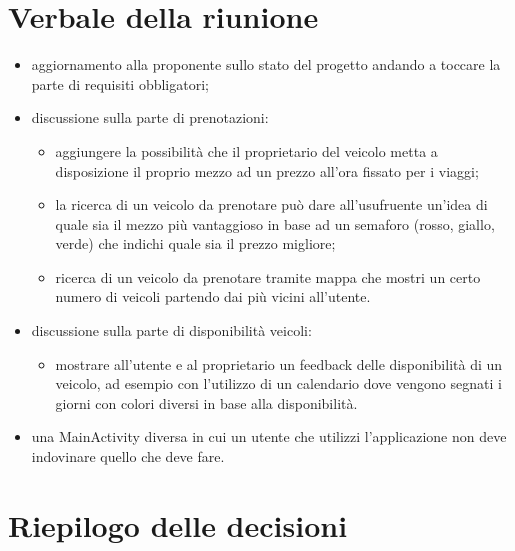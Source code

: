 \section{Verbale della riunione}
\begin{itemize}
	\item aggiornamento alla proponente sullo stato del progetto andando a toccare la parte di requisiti obbligatori;
	\item discussione sulla parte di prenotazioni:
	\begin{itemize}
		\item aggiungere la possibilità che il proprietario del veicolo metta a disposizione il proprio mezzo ad un prezzo all'ora fissato per i viaggi;
		\item la ricerca di un veicolo da prenotare può dare all'usufruente un'idea di quale sia il mezzo più vantaggioso in base ad un semaforo (rosso, giallo, verde) che indichi quale sia il prezzo migliore;
		\item ricerca di un veicolo da prenotare tramite mappa che mostri un certo numero di veicoli partendo dai più vicini all'utente. 
	\end{itemize}
	\item discussione sulla parte di disponibilità veicoli:
	\begin{itemize}
		\item mostrare all'utente e al proprietario un feedback delle disponibilità di un veicolo, ad esempio con l'utilizzo di un calendario dove vengono segnati i giorni con colori diversi in base alla disponibilità.
	\end{itemize}
	\item una MainActivity diversa in cui un utente che utilizzi l'applicazione non deve indovinare quello che deve fare.
\end{itemize}	 

\pagebreak
\section{Riepilogo delle decisioni}

	
